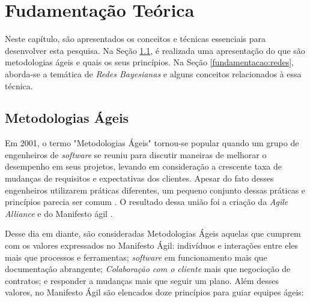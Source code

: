\chapter{Fudamentação Teórica}
\label{fundamentacao}

Neste capítulo, são apresentados os conceitos e técnicas essenciais para desenvolver esta pesquisa. Na Seção \ref{fundamentacao:ageis}, é realizada uma apresentação do que são metodologias ágeis e quais os seus princípios. Na Seção \ref{fundamentacao:redes}, aborda-se a temática de \textit{Redes Bayesianas} e alguns conceitos relacionados à essa técnica.

\section{Metodologias Ágeis}
\label{fundamentacao:ageis}

Em 2001, o termo "Metodologias Ágeis" tornou-se popular quando um grupo de engenheiros de \textit{software} se reuniu para discutir maneiras de melhorar o desempenho em seus projetos, levando em consideração a crescente taxa de mudanças de requisitos e expectativas dos clientes. Apesar do fato desses engenheiros utilizarem práticas diferentes, um pequeno conjunto dessas práticas e princípios parecia ser comum \cite{williams}. O resultado dessa união foi a criação da \textit{Agile Alliance} e do Manifesto ágil \cite{manifesto}.

Desse dia em diante, são consideradas Metodologias Ágeis aquelas que cumprem com os valores expressados no Manifesto Ágil: indivíduos e interações entre eles mais que processos e ferramentas; \textit{software} em funcionamento mais que documentação abrangente; \textit{Colaboração com o cliente} mais que negocioção de contratos; e responder a mudanças mais que seguir um plano. Além desses valores, no Manifesto Ágil são elencados doze princípios para guiar equipes ágeis:


